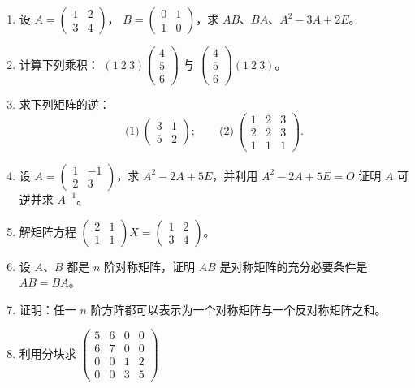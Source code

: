 \begin{enumerate}[label=\arabic*., itemsep=2pt]
\item 设
  $A=\begin{pmatrix} 1 & 2 \\ 3 & 4 \end{pmatrix}$，
  $B=\begin{pmatrix} 0 & 1 \\ 1 & 0 \end{pmatrix}$，求 $AB$、$BA$、$A^2-3A+2E$。
\item 计算下列乘积：
  $(1\ 2\ 3)\begin{pmatrix} 4 \\ 5 \\ 6 \end{pmatrix}$ 与
  $\begin{pmatrix} 4 \\ 5 \\ 6 \end{pmatrix}(1\ 2\ 3)$。
\item 求下列矩阵的逆：
  \[
  \text{(1)}\ \begin{pmatrix} 3 & 1 \\ 5 & 2 \end{pmatrix};
  \qquad
  \text{(2)}\ \begin{pmatrix} 1 & 2 & 3 \\ 2 & 2 & 3 \\ 1 & 1 & 1 \end{pmatrix}.
  \]
\item 设 $A=\begin{pmatrix} 1 & -1 \\ 2 & 3 \end{pmatrix}$，求
  $A^2-2A+5E$，并利用 $A^2-2A+5E=O$ 证明 $A$ 可逆并求 $A^{-1}$。
\item 解矩阵方程
  $\begin{pmatrix} 2 & 1 \\ 1 & 1 \end{pmatrix}X
   =\begin{pmatrix} 1 & 2 \\ 3 & 4 \end{pmatrix}$。
\item 设 $A$、$B$ 都是 $n$ 阶对称矩阵，证明 $AB$ 是对称矩阵的充分必要条件是
  $AB=BA$。
\item 证明：任一 $n$ 阶方阵都可以表示为一个对称矩阵与一个反对称矩阵之和。
\item 利用分块求
  $\begin{pmatrix} 5 & 6 & 0 & 0 \\ 6 & 7 & 0 & 0 \\ 0 & 0 & 1 & 2 \\ 0 & 0 & 3 & 5 \end{pmatrix}$

\end{enumerate}
